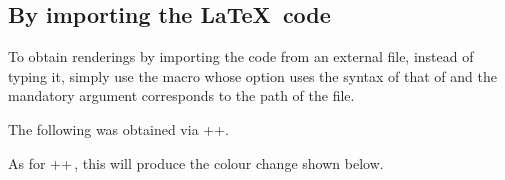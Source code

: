 \documentclass[10pt, a4paper]{tutodoc}
\begin{document}
\subsection{By importing the \LaTeX\ code}

To obtain renderings by importing the code from an external file, instead of typing it, simply use the  macro whose option uses the syntax of that of  and the mandatory argument corresponds to the path of the file.


\begin{tdocexa}
    The following was obtained via \tdocinlatex++.

    \medskip


    \medskip

    As for \tdocinlatex++\,, this will produce the colour change shown below.

    \medskip

\end{tdocexa}
\end{document}
